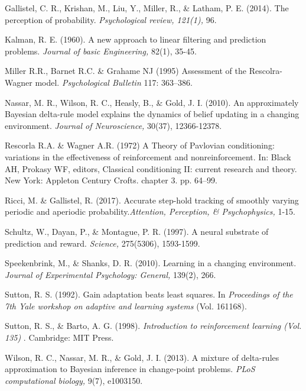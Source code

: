 \documentclass[jou,apacite]{apa6}
\begin{document}
\begin{hangparas}{.3in}{1}

Gallistel, C. R., Krishan, M., Liu, Y., Miller, R., \& Latham, P. E. (2014). The perception of probability. {\it Psychological review, 121(1),} 96.

Kalman, R. E. (1960). A new approach to linear filtering and prediction problems. {\it Journal of basic Engineering,} 82(1), 35-45.

Miller R.R., Barnet R.C. \& Grahame NJ (1995) Assessment of the Rescolra-Wagner model. {\it Psychological Bulletin} 117: 363–386.

Nassar, M. R., Wilson, R. C., Heasly, B., \& Gold, J. I. (2010). An approximately Bayesian delta-rule model explains the dynamics of belief updating in a changing environment. {\it Journal of Neuroscience,} 30(37), 12366-12378.

Rescorla R.A. \& Wagner A.R. (1972) A Theory of Pavlovian conditioning: variations in the effectiveness of reinforcement and nonreinforcement. In: Black AH, Prokasy WF, editors, Classical conditioning II: current research and theory. New York: Appleton Century Crofts. chapter 3. pp. 64–99. 

Ricci, M. \& Gallistel, R. (2017). Accurate step-hold tracking of smoothly varying periodic and aperiodic probability.{\it Attention, Perception, \& Psychophysics, }1-15.

Schultz, W., Dayan, P., \& Montague, P. R. (1997). A neural substrate of prediction and reward. {\it Science,} 275(5306), 1593-1599.

Speekenbrink, M., \& Shanks, D. R. (2010). Learning in a changing environment. {\it Journal of Experimental Psychology: General,} 139(2), 266.

Sutton, R. S. (1992). Gain adaptation beats least squares. In {\it Proceedings of the 7th Yale workshop on adaptive and learning systems} (Vol. 161168).

Sutton, R. S., \& Barto, A. G. (1998). {\it Introduction to reinforcement learning (Vol. 135)} . Cambridge: MIT Press.

Wilson, R. C., Nassar, M. R., \& Gold, J. I. (2013). A mixture of delta-rules approximation to Bayesian inference in change-point problems. {\it PLoS computational biology,} 9(7), e1003150.


\end{hangparas}


\onecolumn


\end{document}
